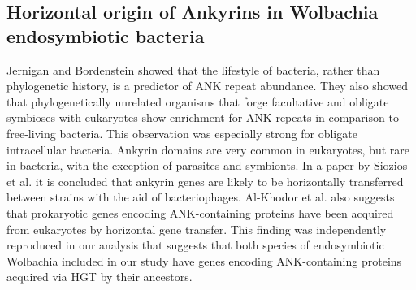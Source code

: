 \subsection{Horizontal origin of Ankyrins in Wolbachia endosymbiotic bacteria}
Jernigan and Bordenstein \cite{Jernigan2014} showed that the lifestyle of bacteria, rather
than phylogenetic history, is a predictor of ANK repeat abundance. They also
showed that phylogenetically unrelated organisms that forge facultative and
obligate symbioses with eukaryotes show enrichment for ANK repeats in
comparison to free-living bacteria. This observation was especially strong for
obligate intracellular bacteria. Ankyrin domains are very common in eukaryotes,
but rare in bacteria, with the exception of parasites and symbionts. In a paper
by Siozios et al. \cite{Siozios2013} it is concluded that ankyrin genes are likely to be
horizontally transferred between strains with the aid of bacteriophages.
Al-Khodor et al. \cite{Al-Khodor2010} also suggests that prokaryotic genes encoding
ANK-containing proteins have been acquired from eukaryotes by horizontal gene
transfer. This finding was independently reproduced in our analysis that
suggests that both species of endosymbiotic Wolbachia included in our study
have genes encoding ANK-containing proteins acquired via HGT by their
ancestors.
